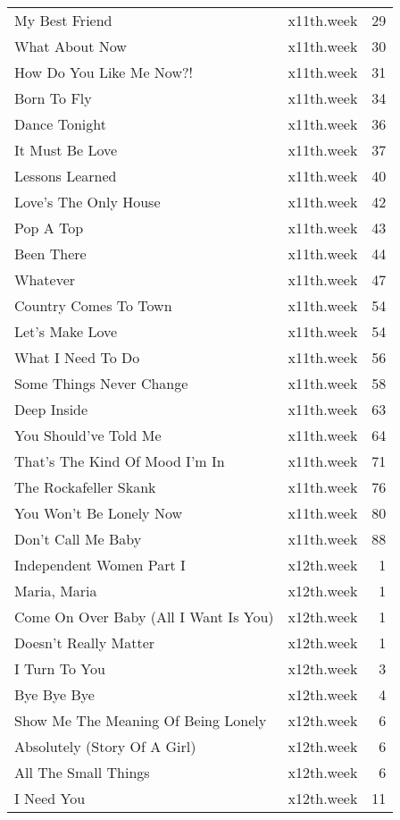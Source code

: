 \begin{table}[ht]
\begin{tabular}{llr}
  My Best Friend & x11th.week &  29 \\ 
  What About Now & x11th.week &  30 \\ 
  How Do You Like Me Now?! & x11th.week &  31 \\ 
  Born To Fly & x11th.week &  34 \\ 
  Dance Tonight & x11th.week &  36 \\ 
  It Must Be Love & x11th.week &  37 \\ 
  Lessons Learned & x11th.week &  40 \\ 
  Love's The Only House & x11th.week &  42 \\ 
  Pop A Top & x11th.week &  43 \\ 
  Been There & x11th.week &  44 \\ 
  Whatever & x11th.week &  47 \\ 
  Country Comes To Town & x11th.week &  54 \\ 
  Let's Make Love & x11th.week &  54 \\ 
  What I Need To Do & x11th.week &  56 \\ 
  Some Things Never Change & x11th.week &  58 \\ 
  Deep Inside & x11th.week &  63 \\ 
  You Should've Told Me & x11th.week &  64 \\ 
  That's The Kind Of Mood I'm In & x11th.week &  71 \\ 
  The Rockafeller Skank & x11th.week &  76 \\ 
  You Won't Be Lonely Now & x11th.week &  80 \\ 
  Don't Call Me Baby & x11th.week &  88 \\ 
  Independent Women Part I & x12th.week &   1 \\ 
  Maria, Maria & x12th.week &   1 \\ 
  Come On Over Baby (All I Want Is You) & x12th.week &   1 \\ 
  Doesn't Really Matter & x12th.week &   1 \\ 
  I Turn To You & x12th.week &   3 \\ 
  Bye Bye Bye & x12th.week &   4 \\ 
  Show Me The Meaning Of Being Lonely & x12th.week &   6 \\ 
  Absolutely (Story Of A Girl) & x12th.week &   6 \\ 
  All The Small Things & x12th.week &   6 \\ 
  I Need You & x12th.week &  11 \\ 

\end{tabular}
\end{table}
